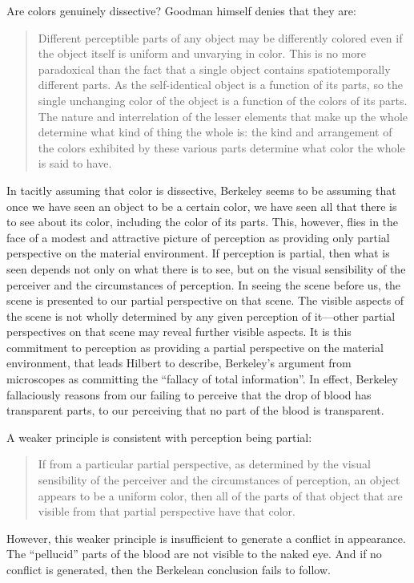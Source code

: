 \documentclass[12pt]{article}
\begin{document}
Are colors genuinely dissective? Goodman himself denies that they are:
\begin{quote}
	Different perceptible parts of any object may be differently colored even if the object itself is uniform and unvarying in color. This is no more paradoxical than the fact that a single object contains spatiotemporally different parts. As the self-identical object is a function of its parts, so the single unchanging color of the object is a function of the colors of its parts. The nature and interrelation of the lesser elements that make up the whole determine what kind of thing the whole is: the kind and arrangement of the colors exhibited by these various parts determine what color the whole is said to have. \citep[130]{Goodman:1951ww}
\end{quote}
In tacitly assuming that color is dissective, Berkeley seems to be assuming that once we have seen an object to be a certain color, we have seen all that there is to see about its color, including the color of its parts. This, however, flies in the face of a modest and attractive picture of perception as providing only partial perspective on the material environment. If perception is partial, then what is seen depends not only on what there is to see, but on the visual sensibility of the perceiver and the circumstances of perception. In seeing the scene before us, the scene is presented to our partial perspective on that scene. The visible aspects of the scene is not wholly determined by any given perception of it---other partial perspectives on that scene may reveal further visible aspects. It is this commitment to perception as providing a partial perspective on the material environment, that leads Hilbert to describe, Berkeley's argument from microscopes as committing the ``fallacy of total information''. In effect, Berkeley fallaciously reasons from our failing to perceive that the drop of blood has transparent parts, to our perceiving that no part of the blood is transparent.

A weaker principle is consistent with perception being partial:
\begin{quote}
	If from a particular partial perspective, as determined by the visual sensibility of the perceiver and the circumstances of perception, an object appears to be a uniform color, then all of the parts of that object that are visible from that partial perspective have that color.
\end{quote}
However, this weaker principle is insufficient to generate a conflict in appearance. The ``pellucid'' parts of the blood are not visible to the naked eye. And if no conflict is generated, then the Berkelean conclusion fails to follow.
\end{document}
